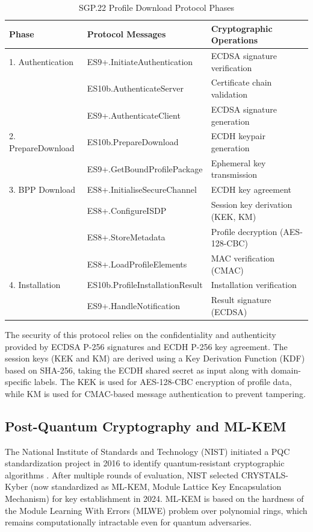 \documentclass{easychair}
\begin{document}
\begin{table}[h]
\centering
\caption{SGP.22 Profile Download Protocol Phases}
\label{tab:protocol-phases}
\begin{tabular}{@{}lll@{}}
\toprule
\textbf{Phase} & \textbf{Protocol Messages} & \textbf{Cryptographic Operations} \\
\midrule
1. Authentication & ES9+.InitiateAuthentication & ECDSA signature verification \\
 & ES10b.AuthenticateServer & Certificate chain validation \\
 & ES9+.AuthenticateClient & ECDSA signature generation \\
\midrule
2. PrepareDownload & ES10b.PrepareDownload & ECDH keypair generation \\
 & ES9+.GetBoundProfilePackage & Ephemeral key transmission \\
\midrule
3. BPP Download & ES8+.InitialiseSecureChannel & ECDH key agreement \\
 & ES8+.ConfigureISDP & Session key derivation (KEK, KM) \\
 & ES8+.StoreMetadata & Profile decryption (AES-128-CBC) \\
 & ES8+.LoadProfileElements & MAC verification (CMAC) \\
\midrule
4. Installation & ES10b.ProfileInstallationResult & Installation verification \\
 & ES9+.HandleNotification & Result signature (ECDSA) \\
\bottomrule
\end{tabular}
\end{table}

The security of this protocol relies on the confidentiality and authenticity provided by ECDSA P-256 signatures and ECDH P-256 key agreement. The session keys (KEK and KM) are derived using a Key Derivation Function (KDF) based on SHA-256, taking the ECDH shared secret as input along with domain-specific labels. The KEK is used for AES-128-CBC encryption of profile data, while KM is used for CMAC-based message authentication to prevent tampering.

\subsection{Post-Quantum Cryptography and ML-KEM}

The National Institute of Standards and Technology (NIST) initiated a PQC standardization project in 2016 to identify quantum-resistant cryptographic algorithms \cite{NIST_PQC2024}. After multiple rounds of evaluation, NIST selected CRYSTALS-Kyber (now standardized as ML-KEM, Module Lattice Key Encapsulation Mechanism) for key establishment in 2024. ML-KEM is based on the hardness of the Module Learning With Errors (MLWE) problem over polynomial rings, which remains computationally intractable even for quantum adversaries.
\end{document}
